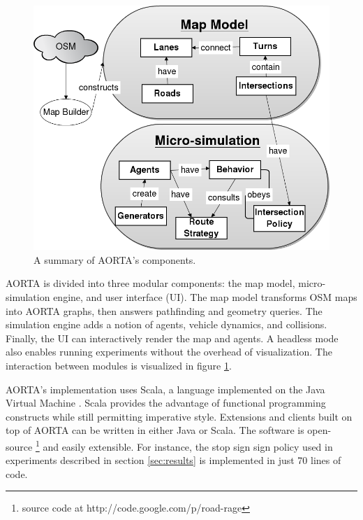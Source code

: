 \documentclass[letterpaper, 10 pt, conference]{ieeeconf}  %
\begin{document}
\begin{figure}
  \centering \includegraphics[scale=0.3]{architecture.png}
  \caption{A summary of AORTA's components.}
  \label{fig:arch}
  \vspace{-20pt}
\end{figure}

AORTA is divided into three modular components: the map model, micro-simulation
engine, and user interface (UI). The map model transforms OSM maps into AORTA
graphs, then answers pathfinding and geometry queries. The simulation engine
adds a notion of agents, vehicle dynamics, and collisions. Finally, the UI can
interactively render the map and agents. A headless mode also enables running
experiments without the overhead of visualization. The interaction between
modules is visualized in figure \ref{fig:arch}.

AORTA's implementation uses Scala, a language implemented on the Java Virtual
Machine \cite{scala}. Scala provides the advantage of functional programming
constructs while still permitting imperative style.  Extensions and clients
built on top of AORTA can be written in either Java or Scala. The software is
open-source \footnote{source code at http://code.google.com/p/road-rage} and
easily extensible. For instance, the stop sign sign policy used in experiments
described in section \ref{sec:results} is implemented in just 70 lines of code.

\end{document}
